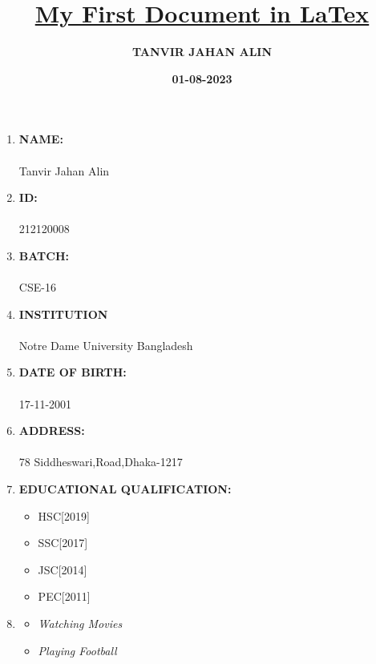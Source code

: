 \documentclass{article}
\title{\underline{\textbf{My First Document in LaTex}}}
\date{\textbf{01-08-2023}}
\author{\textbf{TANVIR JAHAN ALIN}}
\begin{document}
\maketitle
\begin{enumerate}
\item \textbf{{\color{blue}NAME:}}\\\\Tanvir Jahan Alin
\item \textbf{{\color{blue}ID:}}\\\\212120008
\item \textbf{{\color{blue}BATCH:}}\\\\CSE-16
\item\textbf{{\color{blue}INSTITUTION}}\\\\Notre Dame University Bangladesh
\item \textbf{{\color{blue}DATE OF BIRTH:}}\\\\17-11-2001
\item \textbf{{\color{blue}ADDRESS:}}\\\\78 Siddheswari,Road,Dhaka-1217
\item \textbf{{\color{blue}EDUCATIONAL QUALIFICATION:}}
\begin{itemize}
\item HSC[2019]
\item SSC[2017]
\item JSC[2014]
\item PEC[2011]
\end{itemize}
\item \textbf{\color{blue}{HOBBY:}}
\begin{itemize}
\item \textit{Watching Movies}
\item \textit{Playing Football}
\end{itemize}
\end{enumerate} 
\end{document}
